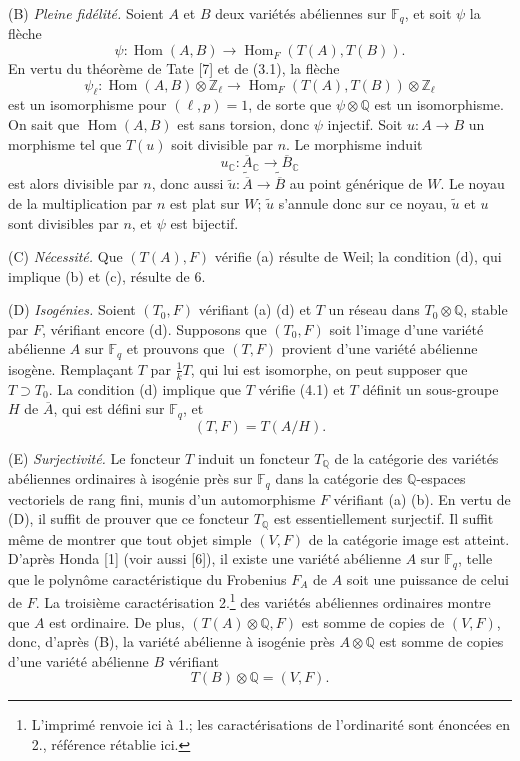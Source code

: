 \documentclass[10pt]{article}
\newcommand{\C}{\mathbb C}
\newcommand{\Fq}{\mathbb F_q}
\newcommand{\Q}{\mathbb Q}
\newcommand{\Z}{\mathbb Z}
\newcommand{\Hom}{\operatorname{Hom}}
\begin{document}
(B) \emph{Pleine fidélité.} Soient $A$ et $B$ deux variétés abéliennes sur $\Fq$, et soit $\psi$ la flèche
\[
\psi:\Hom(A,B)\longrightarrow\Hom_F(T(A),T(B)).
\]
En vertu du théorème de Tate [7] et de (3.1), la flèche
\[
\psi_\ell:\Hom(A,B)\otimes\Z_\ell
\longrightarrow
\Hom_F(T(A),T(B))\otimes\Z_\ell
\]
est un isomorphisme pour $(\ell,p)=1$, de sorte que $\psi\otimes\Q$ est un isomorphisme. On sait que $\Hom(A,B)$ est sans torsion, donc $\psi$ injectif. Soit $u:A\to B$ un morphisme tel que $T(u)$ soit divisible par $n$. Le morphisme induit
\[
u_{\C}:\overline A_{\C}\longrightarrow\overline B_{\C}
\]
est alors divisible par $n$, donc aussi $\widetilde u:\widetilde{\overline A}\to\widetilde{\overline B}$ au point générique de $W$. Le noyau de la multiplication par $n$ est plat sur $W$; $\widetilde u$ s'annule donc sur ce noyau, $\widetilde u$ et $u$ sont divisibles par $n$, et $\psi$ est bijectif.

(C) \emph{Nécessité.} Que $(T(A),F)$ vérifie (a) résulte de Weil; la condition (d), qui implique (b) et (c), résulte de 6.

(D) \emph{Isogénies.} Soient $(T_0,F)$ vérifiant (a) (d) et $T$ un réseau dans $T_0\otimes\Q$, stable par $F$, vérifiant encore (d). Supposons que $(T_0,F)$ soit l'image d'une variété abélienne $A$ sur $\Fq$ et prouvons que $(T,F)$ provient d'une variété abélienne isogène. Remplaçant $T$ par $\frac1kT$, qui lui est isomorphe, on peut supposer que $T\supset T_0$. La condition (d) implique que $T$ vérifie (4.1) et $T$ définit un sous-groupe $H$ de $\overline A$, qui est défini sur $\Fq$, et
\[
(T,F)=T(A/H).
\]

(E) \emph{Surjectivité.} Le foncteur $T$ induit un foncteur $T_\Q$ de la catégorie des variétés abéliennes ordinaires à isogénie près sur $\Fq$ dans la catégorie des $\Q$-espaces vectoriels de rang fini, munis d'un automorphisme $F$ vérifiant (a) (b). En vertu de (D), il suffit de prouver que ce foncteur $T_\Q$ est essentiellement surjectif. Il suffit même de montrer que tout objet simple $(V,F)$ de la catégorie image est atteint. D'après Honda [1] (voir aussi [6]), il existe une variété abélienne $A$ sur $\Fq$, telle que le polynôme caractéristique du Frobenius $F_A$ de $A$ soit une puissance de celui de $F$. La troisième caractérisation 2.\footnote{L'imprimé renvoie ici à 1.; les caractérisations de l'ordinarité sont énoncées en 2., référence rétablie ici.} des variétés abéliennes ordinaires montre que $A$ est ordinaire. De plus, $(T(A)\otimes\Q,F)$ est somme de copies de $(V,F)$, donc, d'après (B), la variété abélienne à isogénie près $A\otimes\Q$ est somme de copies d'une variété abélienne $B$ vérifiant
\[
T(B)\otimes\Q=(V,F).
\]
\end{document}
